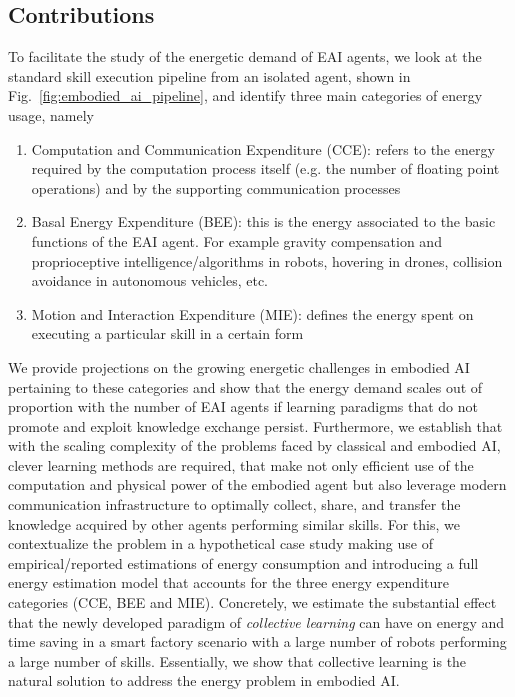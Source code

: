 \subsection{Contributions}
To facilitate the study of the energetic demand of EAI agents, we look at the standard skill execution pipeline from an isolated agent, shown in Fig.~\ref{fig:embodied_ai_pipeline}, and identify three main categories of energy usage, namely
\begin{enumerate}
    \item Computation and Communication Expenditure (CCE): refers to the energy required by the computation process itself (e.g. the number of floating point operations) and by the supporting communication processes
    \item Basal Energy Expenditure (BEE): this is the energy associated to the basic functions of the EAI agent. For example gravity compensation and proprioceptive intelligence/algorithms in robots, hovering in drones, collision avoidance in autonomous vehicles, etc.
    \item Motion and Interaction Expenditure (MIE): defines the energy spent on executing a particular skill in a certain form
\end{enumerate}
We provide projections on the growing energetic challenges in embodied AI pertaining to these categories and show that the energy demand scales out of proportion with the number of EAI agents if learning paradigms that do not promote and exploit knowledge exchange persist. Furthermore, we establish that with the scaling complexity of the problems faced by classical and embodied AI, clever learning methods are required, that make not only efficient use of the computation and physical power of the embodied agent but also leverage modern communication infrastructure to optimally collect, share, and transfer the knowledge acquired by other agents performing similar skills. %
For this, we contextualize the problem in a hypothetical case study  making use of empirical/reported estimations of energy consumption and introducing a full energy estimation model that accounts for the three energy expenditure categories (CCE, BEE and MIE). Concretely, we estimate the substantial effect that the newly developed  paradigm of \emph{collective learning} can have on energy and time saving in a smart factory scenario with a large number of robots performing a large number of skills. Essentially, we show that collective learning is the natural solution to address the energy problem in embodied AI.


